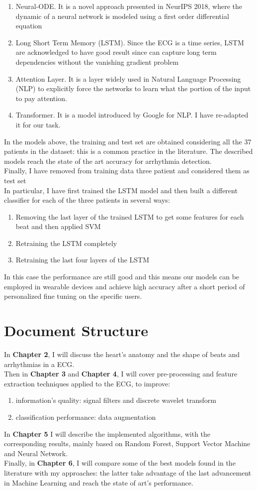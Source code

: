 \documentclass[LaM,binding=0.6cm]{sapthesis}
\begin{document}
\begin{enumerate}
\item Neural-ODE. It is a novel approach presented in NeurIPS 2018, where the dynamic of a neural network is modeled using a first order differential equation
\item Long Short Term Memory (LSTM). Since the ECG is a time series, LSTM are acknowledged to have good result since can capture long term dependencies without the vanishing gradient problem
\item Attention Layer. It is a layer widely used in Natural Language Processing (NLP) to explicitly force the networks to learn what the portion of the input to pay attention. 
\item Transformer. It is a model introduced by Google for NLP. I have re-adapted it for our task.
\end{enumerate}  
In the models above, the training and test set are obtained considering all the 37 patients in the dataset: this is a common practice in the literature. The described models reach the state of the art accuracy for arrhythmia detection.\\Finally, I have removed from training data three patient and considered them as test set\\In particular, I have first trained the LSTM model and then  built a different classifier for each of the three patients in several ways:
\begin{enumerate}
\item Removing the last layer of the trained LSTM to get some features for each beat and then applied SVM
\item Retraining the LSTM completely 
\item Retraining the last four layers of the LSTM 
\end{enumerate}
In this case the performance are still good and this means our models can be employed in wearable devices and achieve high accuracy after a short period of personalized fine tuning on the specific users.   
\section{Document Structure}
In \textbf{Chapter 2}, I will discuss the heart's anatomy and the shape of beats and arrhythmias in a ECG.\\Then in \textbf{Chapter 3} and \textbf{Chapter 4}, I will cover pre-processing and feature extraction techniques applied to the ECG, to improve:
\begin{enumerate}
\item information's quality: signal filters and discrete wavelet transform
\item classification performance: data augmentation 
\end{enumerate}
In \textbf{Chapter 5} I will describe the implemented algorithms, with the corresponding results, mainly based on Random Forest, Support Vector Machine and Neural Network.\\Finally, in \textbf{Chapter 6}, I will compare some of the best models found in the literature with my approaches: the latter take advantage of the last advancement in Machine Learning and reach the state of art's performance.
\end{document}
